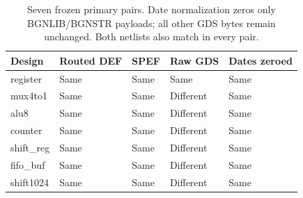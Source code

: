 \begin{table}[htbp]\centering\small\setlength{\tabcolsep}{4pt}
\caption{Seven frozen primary pairs. Date normalization zeros only BGNLIB/BGNSTR payloads; all other GDS bytes remain unchanged. Both netlists also match in every pair.}\label{tab:reproducibility}
\begin{tabular}{@{}lllll@{}}\toprule
Design & Routed DEF & SPEF & Raw GDS & Dates zeroed \\
\midrule
register & Same & Same & Same & Same \\
mux4to1 & Same & Same & Different & Same \\
alu8 & Same & Same & Different & Same \\
counter & Same & Same & Different & Same \\
shift\_reg & Same & Same & Different & Same \\
fifo\_buf & Same & Same & Different & Same \\
shift1024 & Same & Same & Different & Same \\
\bottomrule\end{tabular}\end{table}
